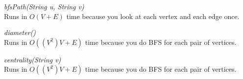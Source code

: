 \documentclass[11pt]{article}
\begin{document}
\vspace{2mm}
\textit{bfsPath(String u, String v)}\\
Runs in $O(V+E)$ time because you look at each vertex and each edge once.

\vspace{2mm}
\textit{diameter()}\\
Runs in $O((V^2)V+E)$ time because you do BFS for each pair of vertices.

\vspace{2mm}
\textit{centrality(String v)}\\
Runs in $O((V^2)V+E)$ time because you do BFS for each pair of vertices.
\end{document}
